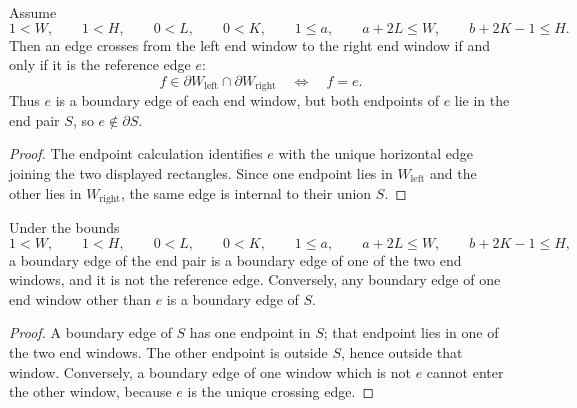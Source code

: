 \begin{theorem}
    \label{thm:peps_horizontal_staircase_reference_edge_crossing}
    \leanok
    Assume
    \[
        1<W,\qquad 1<H,\qquad 0<L,\qquad 0<K,\qquad 1\le a,\qquad
        a+2L\le W,\qquad b+2K-1\le H.
    \]
    Then an edge crosses from the left end window to the right end window if
    and only if it is the reference edge $e$:
    \[
        f\in\partial W_{\mathrm{left}}\cap\partial W_{\mathrm{right}}
        \quad\Longleftrightarrow\quad
        f=e.
    \]
    Thus $e$ is a boundary edge of each end window, but both endpoints of $e$
    lie in the end pair $S$, so $e\notin\partial S$.
\end{theorem}
\begin{proof}
    \leanok
    The endpoint calculation identifies $e$ with the unique horizontal edge
    joining the two displayed rectangles.  Since one endpoint lies in
    $W_{\mathrm{left}}$ and the other lies in $W_{\mathrm{right}}$, the same
    edge is internal to their union $S$.
\end{proof}

\begin{lemma}
    \label{lem:peps_horizontal_staircase_end_pair_boundary_from_windows}
    \leanok
    Under the bounds
    \[
        1<W,\qquad 1<H,\qquad 0<L,\qquad 0<K,\qquad 1\le a,\qquad
        a+2L\le W,\qquad b+2K-1\le H,
    \]
    a boundary edge of the end pair is a boundary edge of one of the two end
    windows, and it is not the reference edge.  Conversely, any boundary edge
    of one end window other than $e$ is a boundary edge of $S$.
\end{lemma}
\begin{proof}
    \leanok
    A boundary edge of $S$ has one endpoint in $S$; that endpoint lies in one
    of the two end windows.  The other endpoint is outside $S$, hence outside
    that window.  Conversely, a boundary edge of one window which is not $e$
    cannot enter the other window, because $e$ is the unique crossing edge.
\end{proof}

